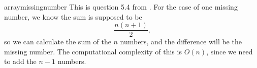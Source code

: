 \begin{answer}{arraymissingnumber}
This is question 5.4 from \citet{JoshiQA}.
For the case of one missing number, we know the sum is supposed to be
\[
  \frac{n (n+1) }{2}
  \text{,}
\]
so we can calculate the sum of the $n$ numbers, and the difference will be the missing number.
The computational complexity of this is $O(n)$, since we need to add the $n-1$ numbers.
\end{answer}